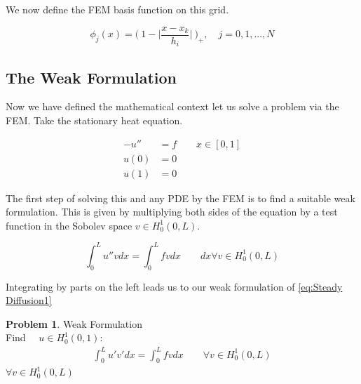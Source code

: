 \documentclass{uonmathreport}
\theoremstyle{definition}
\theoremstyle{problem}
\newtheorem{problem}{Problem}[section]
\theoremstyle{theorem}
\begin{document}
\begin{center}
\end{center}


We now define the FEM basis function on this grid. 

\begin{equation}
\phi_j(x) =  \Big(\:1 - \Big|\frac{x-x_k}{h_i}\Big| \: \Big)_+ , \quad j = 0,1,..., N
\end{equation}





\subsection{The Weak Formulation} \label{subsec:Weak Formulation}

Now we have defined the mathematical context let us solve a problem via the FEM. Take the stationary heat equation.

\begin{subequations} 
\label{eq:Steady Diffusion1} 
\begin{align}
-u'' &= f		\quad \quad  x \in [0, 1] \\  	
u(0) &= 0 \\
u(1) &= 0
\end{align}
\end{subequations}

The first step of solving this and any PDE by the FEM is to find a suitable weak formulation. This is given by multiplying both sides of the equation by a test function in the Sobolev space $v \in H^1_0(0, L)$.

\begin{equation*}
\int_0^L  u'' v  dx = \int_0^L  f v dx 	\quad \quad  dx \forall v \in H^1_0(0, L)
\end{equation*}

Integrating by parts on the left leads us to our weak formulation of \ref{eq:Steady Diffusion1}

\begin{problem}{Weak Formulation} \label{prob:Weak Formulation Elliptic}
\\Find $\quad u \in H^1_0(0, 1)$:
\begin{align*}
\int_0^L  u' v'  dx =   \int_0^L  f v dx  \quad \quad  \forall v \in H^1_0(0, L)
\end{align*}
$\forall v \in H^1_0(0, L)$
\end{problem}
\end{document}
